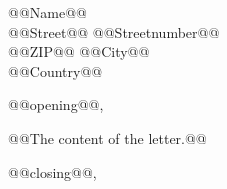 \documentclass[a4paper, 
               ngerman 
              ]{dinbrief}
\makeatletter
\newcommand{\recipient}{@@Name@@\\ @@Street@@ @@Streetnumber@@ \\ 
@@ZIP@@ @@City@@ \\ @@Country@@}
\newcommand{\open}{@@opening@@,}
\newcommand{\close}{@@closing@@,}
\makeatother
\begin{document}
\begin{letter}{\recipient}

\opening{\open}
@@The content of the letter.@@

\closing{\close}


\end{letter}
\end{document}
